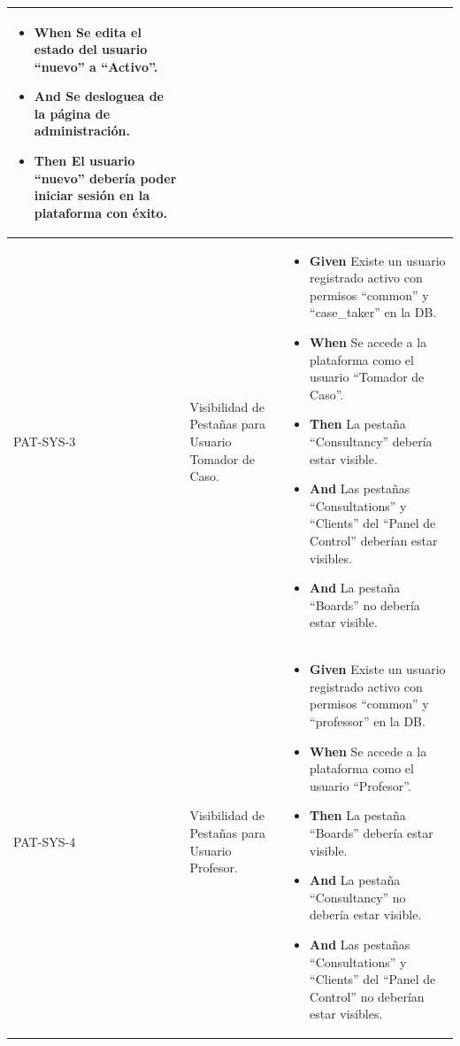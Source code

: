 \begin{longtable}{|p{1cm}|p{2.5cm}|p{12cm}|}
\begin{itemize}
        \item \textbf{When} Se edita el estado del usuario ``nuevo'' a ``Activo''.
        \item \textbf{And} Se desloguea de la página de administración.
        \newline
        \item \textbf{Then} El usuario ``nuevo'' debería poder iniciar sesión en la plataforma con éxito.
    \end{itemize}
    \\
    \hline
    PAT-SYS-3 & Visibilidad de Pestañas para Usuario Tomador de Caso.  &          
    \begin{itemize}
        \item \textbf{Given} Existe un usuario registrado activo con permisos ``common'' y ``case\_taker'' en la DB.
        \newline
        \item \textbf{When} Se accede a la plataforma como el usuario ``Tomador de Caso''.
        \newline
        \item \textbf{Then} La pestaña ``Consultancy'' debería estar visible.
        \item \textbf{And} Las pestañas ``Consultations'' y ``Clients'' del ``Panel de Control'' deberían estar visibles.
        \item \textbf{And} La pestaña ``Boards'' no debería estar visible.
    \end{itemize}
    \\
    \hline
    PAT-SYS-4 & Visibilidad de Pestañas para Usuario Profesor. &  
    \begin{itemize}
        \item \textbf{Given} Existe un usuario registrado activo con permisos ``common'' y ``professor'' en la DB.
        \newline
        \item \textbf{When} Se accede a la plataforma como el usuario ``Profesor''.
        \newline
        \item \textbf{Then} La pestaña ``Boards'' debería estar visible.
        \item \textbf{And} La pestaña ``Consultancy'' no debería estar visible.
        \item \textbf{And} Las pestañas ``Consultations'' y ``Clients'' del ``Panel de Control'' no deberían estar visibles.
    \end{itemize}   
    \\

\end{longtable}
